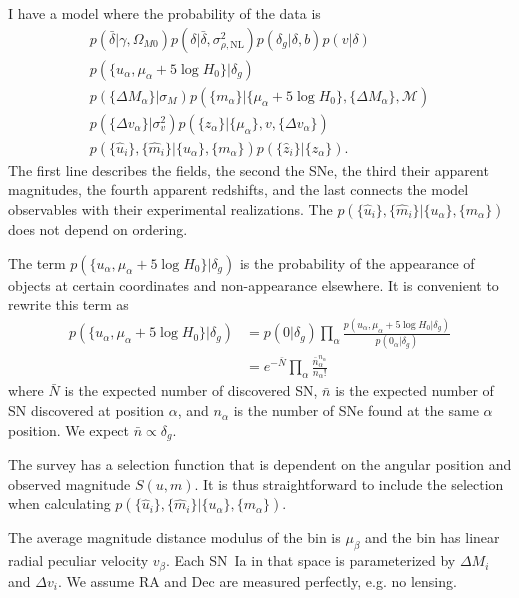 \documentclass{article}
\begin{document}
I have a model where the probability of the data is
\begin{align}
p(\bar{\delta}|\gamma,\Omega_{M0})  p(\delta| \bar{\delta},\sigma^2_{\rho,\text{NL}})  p(\delta_g|\delta,b) p(v|\delta)\\
p(\{u_\alpha, \mu_\alpha + 5\log{H_0}\} | \delta_g) \\
p(\{\Delta M_\alpha\} | \sigma_M) p(\{m_\alpha\} | \{\mu_\alpha + 5\log{H_0}\},\{\Delta M_\alpha\},\mathcal{M})\\
    p(\{\Delta v_\alpha\} | \sigma^2_v)
     p(\{z_\alpha\}| \{\mu_\alpha\}, v, \{\Delta v_\alpha\})\\
     p( \{\hat{u}_i\}, \{\hat{m}_i\}  | \{u_\alpha\}, \{m_\alpha\})       p(\{\hat{z}_i\}| \{z_\alpha\}).
\end{align}
The first line describes the fields, the second the SNe, the third their apparent magnitudes, the fourth apparent redshifts, and the last
connects the model observables with their experimental realizations.
The $p( \{\hat{u}_i\}, \{\hat{m}_i\}  | \{u_\alpha\}, \{m_\alpha\})$ does not depend on ordering.

The term $p(\{u_\alpha, \mu_\alpha + 5\log{H_0}\} | \delta_g)$ is the probability of the appearance of objects at certain coordinates and non-appearance elsewhere.
It is convenient to rewrite this term as
\begin{align}
p(\{u_\alpha, \mu_\alpha + 5\log{H_0}\} | \delta_g) & = p(0| \delta_g) \prod_\alpha \frac{ p(u_\alpha, \mu_\alpha + 5\log{H_0} | \delta_g)}{p(0_\alpha| \delta_g)}  \\
& = e^{-{\bar{N}}}  \prod_\alpha \frac{\bar{n}_\alpha^{n_\alpha}}{n_\alpha!}
\end{align}
where $\bar{N}$ is the expected number of discovered SN, $\bar{n}$ is the expected number of SN discovered at position $\alpha$, and
$n_\alpha$ is the number of SNe found at the same $\alpha$ position.  We expect $\bar{n} \propto \delta_g$.

The survey has a selection function that is dependent on the angular position and observed magnitude $S(u,m)$.
It is thus straightforward to include the selection when calculating $p( \{\hat{u}_i\}, \{\hat{m}_i\}  | \{u_\alpha\}, \{m_\alpha\})$.


\newpage


The average magnitude distance modulus of the bin is $\mu_\beta$ and the bin has linear radial peculiar velocity $v_\beta$.
Each SN~Ia in that space is parameterized by $\Delta M_i$ and $\Delta v_i$.  We assume RA and Dec are measured
perfectly, e.g. no lensing.
\end{document}
